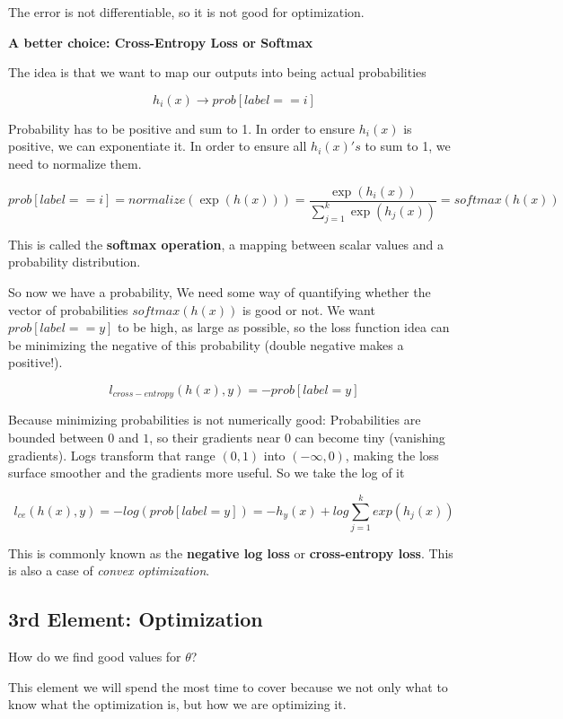 \documentclass[
  letterpaper,
  DIV=11,
  numbers=noendperiod]{scrreprt}
\begin{document}
The error is not differentiable, so it is not good for optimization.

\textbf{A better choice: Cross-Entropy Loss or Softmax}

The idea is that we want to map our outputs into being actual
probabilities

\[h_i(x) \rightarrow prob[label == i]\]

Probability has to be positive and sum to 1. In order to ensure
\(h_i(x)\) is positive, we can exponentiate it. In order to ensure all
\(h_i(x)'s\) to sum to 1, we need to normalize them.

\[prob[label == i] = normalize(\exp(h(x)))= \frac{\exp(h_i(x))}{\sum_{j = 1}^{k} \exp(h_j(x))} = softmax(h(x))\]

This is called the \textbf{softmax operation}, a mapping between scalar
values and a probability distribution.

So now we have a probability, We need some way of quantifying whether
the vector of probabilities \(softmax(h(x))\) is good or not. We want
\(prob[label == y]\) to be high, as large as possible, so the loss
function idea can be minimizing the negative of this probability (double
negative makes a positive!).

\[l_{cross-entropy} (h(x), y) = - prob[label = y]\]

Because minimizing probabilities is not numerically good: Probabilities
are bounded between \(0\) and \(1\), so their gradients near \(0\) can
become tiny (vanishing gradients). Logs transform that range \((0,1)\)
into \((−\infty,0)\), making the loss surface smoother and the gradients
more useful. So we take the log of it

\[l_{ce} (h(x), y) = - log(prob[label = y]) = -h_y(x) + log \sum_{j=1}^{k} exp(h_j(x))\]

This is commonly known as the \textbf{negative log loss} or
\textbf{cross-entropy loss}. This is also a case of \emph{convex
optimization}.

\subsection*{3rd Element: Optimization}\label{rd-element-optimization}

How do we find good values for \(\theta\)?

This element we will spend the most time to cover because we not only
what to know what the optimization is, but how we are optimizing it.
\end{document}
